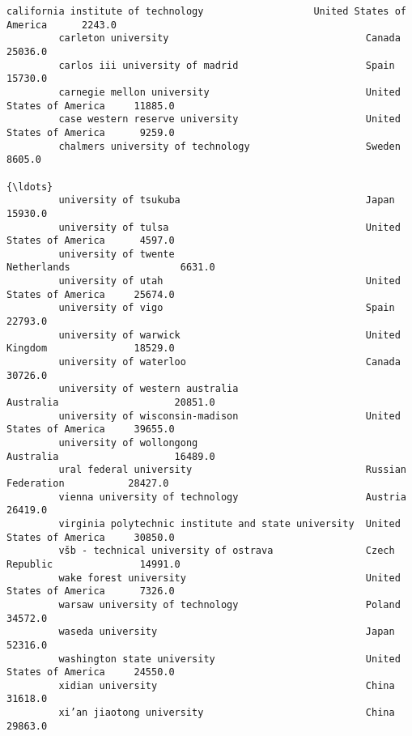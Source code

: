 \documentclass[11pt]{article}
\begin{document}
\begin{Verbatim}[commandchars=\\\{\}]
         california institute of technology                   United States of America      2243.0
         carleton university                                  Canada                       25036.0
         carlos iii university of madrid                      Spain                        15730.0
         carnegie mellon university                           United States of America     11885.0
         case western reserve university                      United States of America      9259.0
         chalmers university of technology                    Sweden                        8605.0
                                                                                            {\ldots}   
         university of tsukuba                                Japan                        15930.0
         university of tulsa                                  United States of America      4597.0
         university of twente                                 Netherlands                   6631.0
         university of utah                                   United States of America     25674.0
         university of vigo                                   Spain                        22793.0
         university of warwick                                United Kingdom               18529.0
         university of waterloo                               Canada                       30726.0
         university of western australia                      Australia                    20851.0
         university of wisconsin-madison                      United States of America     39655.0
         university of wollongong                             Australia                    16489.0
         ural federal university                              Russian Federation           28427.0
         vienna university of technology                      Austria                      26419.0
         virginia polytechnic institute and state university  United States of America     30850.0
         všb - technical university of ostrava                Czech Republic               14991.0
         wake forest university                               United States of America      7326.0
         warsaw university of technology                      Poland                       34572.0
         waseda university                                    Japan                        52316.0
         washington state university                          United States of America     24550.0
         xidian university                                    China                        31618.0
         xi’an jiaotong university                            China                        29863.0

\end{Verbatim}
\end{document}
